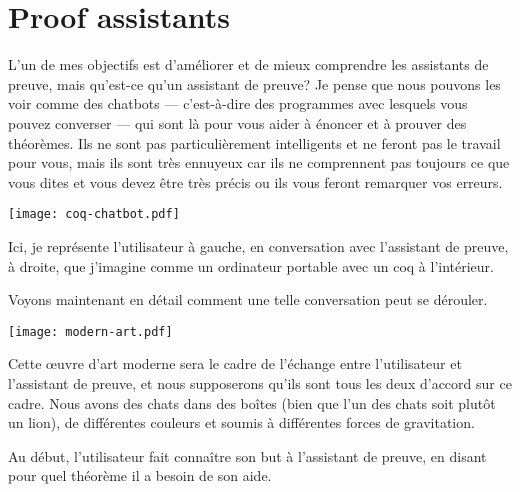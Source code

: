 \section{Proof assistants}

L'un de mes objectifs est d'améliorer et de mieux comprendre les assistants de
preuve, mais qu'est-ce qu'un assistant de preuve?
Je pense que nous pouvons les voir comme des chatbots --- c'est-à-dire des
programmes avec lesquels vous pouvez converser --- qui sont là pour vous aider à
énoncer et à prouver des théorèmes.
Ils ne sont pas particulièrement intelligents et ne feront pas le travail pour
vous, mais ils sont très ennuyeux car ils ne comprennent pas toujours ce que
vous dites et vous devez être très précis ou ils vous feront remarquer vos
erreurs.

%
\begin{center}
  \texttt{[image: coq-chatbot.pdf]}
\end{center}

Ici, je représente l'utilisateur à gauche, en conversation avec l'assistant
de preuve, à droite, que j'imagine comme un ordinateur portable avec un coq à
l'intérieur.

Voyons maintenant en détail comment une telle conversation peut se dérouler.

\begin{center}
  \texttt{[image: modern-art.pdf]}
\end{center}

Cette œuvre d'art moderne sera le cadre de l'échange entre l'utilisateur et
l'assistant de preuve, et nous supposerons qu'ils sont tous les deux d'accord
sur ce cadre.
Nous avons des chats dans des boîtes (bien que l'un des chats soit plutôt un
lion), de différentes couleurs et soumis à différentes forces de gravitation.

Au début, l'utilisateur fait connaître son but à l'assistant de preuve, en
disant pour quel théorème il a besoin de son aide.

